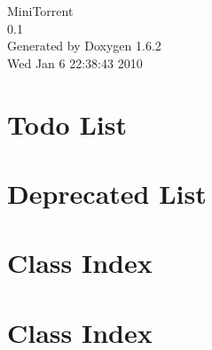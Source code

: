 \documentclass[a4paper]{book}
\begin{document}
\hypersetup{pageanchor=false}
\begin{titlepage}
\vspace*{7cm}
\begin{center}
{\Large MiniTorrent \\[1ex]\large 0.1 }\\
\vspace*{1cm}
{\large Generated by Doxygen 1.6.2}\\
\vspace*{0.5cm}
{\small Wed Jan 6 22:38:43 2010}\\
\end{center}
\end{titlepage}
\clearemptydoublepage
{}
\tableofcontents
\clearemptydoublepage
{}
\hypersetup{pageanchor=true}
\chapter{Todo List}
\label{todo}
\hypertarget{todo}{}

\chapter{Deprecated List}
\label{deprecated}
\hypertarget{deprecated}{}

\chapter{Class Index}

\chapter{Class Index}

\end{document}
